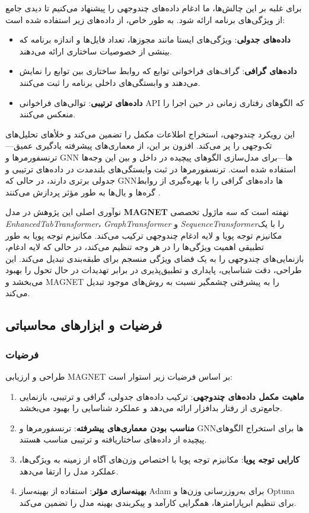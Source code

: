 برای غلبه بر این چالش‌ها، ما ادغام داده‌های چندوجهی را پیشنهاد می‌کنیم تا دیدی جامع از ویژگی‌های برنامه ارائه شود. به طور خاص، از داده‌های زیر استفاده شده است:
\begin{itemize}
    \item \textbf{داده‌های جدولی}: ویژگی‌های ایستا مانند مجوزها، تعداد فایل‌ها و اندازه برنامه که بینشی از خصوصیات ساختاری ارائه می‌دهند.
    \item \textbf{داده‌های گرافی}: گراف‌های فراخوانی توابع که روابط ساختاری بین توابع را نمایش می‌دهند و وابستگی‌های داخلی برنامه را ثبت می‌کنند.
    \item \textbf{داده‌های ترتیبی}: توالی‌های فراخوانی API که الگوهای رفتاری زمانی در حین اجرا را منعکس می‌کنند.
\end{itemize}
این رویکرد چندوجهی، استخراج اطلاعات مکمل را تضمین می‌کند و خلأهای تحلیل‌های تک‌وجهی را پر می‌کند. افزون بر این، از معماری‌های پیشرفته یادگیری عمیق—ترنسفورمرها و GNN ها—برای مدل‌سازی الگوهای پیچیده در داخل و بین این وجه‌ها استفاده شده است. ترنسفورمرها در ثبت وابستگی‌های بلندمدت در داده‌های ترتیبی و جدولی برتری دارند، در حالی که GNNها داده‌های گرافی را با بهره‌گیری از روابط گره‌ها و یال‌ها به طور مؤثر پردازش می‌کنند \cite{attention, Kipf2017}.


نوآوری اصلی این پژوهش در مدل \textbf{MAGNET} نهفته است که سه ماژول تخصصی \textit{EnhancedTabTransformer}، \textit{GraphTransformer} و \textit{SequenceTransformer}را با یک مکانیزم توجه پویا و لایه ادغام چندوجهی ترکیب می‌کند. مکانیزم توجه پویا به طور تطبیقی اهمیت ویژگی‌ها را در هر وجه تنظیم می‌کند، در حالی که لایه ادغام، بازنمایی‌های چندوجهی را به یک فضای ویژگی منسجم برای طبقه‌بندی تبدیل می‌کند. این طراحی، دقت شناسایی، پایداری و تطبیق‌پذیری در برابر تهدیدات در حال تحول را بهبود می‌بخشد و MAGNET را به پیشرفتی چشمگیر نسبت به روش‌های موجود تبدیل می‌کند.

\subsection{فرضیات و ابزارهای محاسباتی}

\subsubsection{فرضیات}
طراحی و ارزیابی MAGNET بر اساس فرضیات زیر استوار است:
\begin{enumerate}
    \item \textbf{ماهیت مکمل داده‌های چندوجهی}: ترکیب داده‌های جدولی، گرافی و ترتیبی، بازنمایی جامع‌تری از رفتار بدافزار ارائه می‌دهد و عملکرد شناسایی را بهبود می‌بخشد.
    \item \textbf{مناسب بودن معماری‌های پیشرفته}: ترنسفورمرها و GNNها برای استخراج الگوهای پیچیده از داده‌های ساختاریافته و ترتیبی مناسب هستند.
    \item \textbf{کارایی توجه پویا}: مکانیزم توجه پویا با اختصاص وزن‌های آگاه از زمینه به ویژگی‌ها، عملکرد مدل را ارتقا می‌دهد.
    \item \textbf{بهینه‌سازی مؤثر}: استفاده از بهینه‌ساز Adam برای به‌روزرسانی وزن‌ها و Optuna برای تنظیم ابرپارامترها، همگرایی کارآمد و پیکربندی بهینه مدل را تضمین می‌کند.
\end{enumerate}

